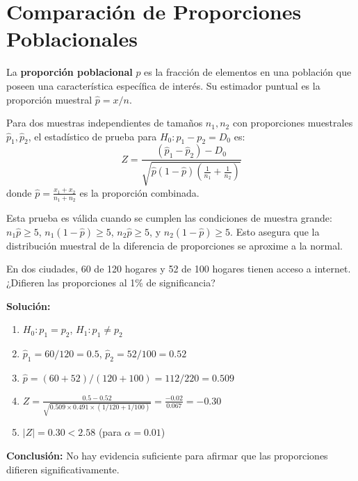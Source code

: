 \section{Comparación de Proporciones Poblacionales}

\begin{definition}
La \textbf{proporción poblacional} $p$ es la fracción de elementos en una población que poseen una característica específica de interés. Su estimador puntual es la proporción muestral $\hat{p} = x/n$.
\end{definition}

\begin{theorem}
Para dos muestras independientes de tamaños $n_1, n_2$ con proporciones muestrales $\hat{p}_1, \hat{p}_2$, el estadístico de prueba para $H_0: p_1 - p_2 = D_0$ es:
\[
Z = \frac{(\hat{p}_1 - \hat{p}_2) - D_0}{\sqrt{\hat{p}(1-\hat{p})\left(\frac{1}{n_1} + \frac{1}{n_2}\right)}}
\]
donde $\hat{p} = \frac{x_1 + x_2}{n_1 + n_2}$ es la proporción combinada.
\end{theorem}

\begin{remark}
Esta prueba es válida cuando se cumplen las condiciones de muestra grande: $n_1\hat{p} \geq 5$, $n_1(1-\hat{p}) \geq 5$, $n_2\hat{p} \geq 5$, y $n_2(1-\hat{p}) \geq 5$. Esto asegura que la distribución muestral de la diferencia de proporciones se aproxime a la normal.
\end{remark}

\begin{example}
En dos ciudades, 60 de 120 hogares y 52 de 100 hogares tienen acceso a internet. ¿Difieren las proporciones al 1\% de significancia?

\textbf{Solución:}
\begin{enumerate}
    \item $H_0: p_1 = p_2$, $H_1: p_1 \neq p_2$
    \item $\hat{p}_1 = 60/120 = 0.5$, $\hat{p}_2 = 52/100 = 0.52$
    \item $\hat{p} = (60+52)/(120+100) = 112/220 = 0.509$
    \item $Z = \frac{0.5 - 0.52}{\sqrt{0.509 \times 0.491 \times (1/120 + 1/100)}} = \frac{-0.02}{0.067} = -0.30$
    \item $|Z| = 0.30 < 2.58$ (para $\alpha = 0.01$)
\end{enumerate}
\textbf{Conclusión:} No hay evidencia suficiente para afirmar que las proporciones difieren significativamente.
\end{example}

